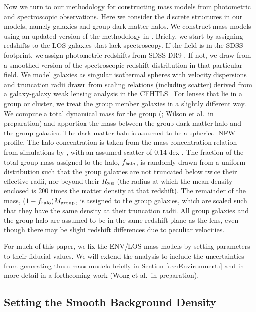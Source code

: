 \documentclass{emulateapj}
\begin{document}
Now we turn to our methodology for constructing mass models from photometric and spectroscopic observations. Here we consider the discrete structures in our models, namely galaxies and group dark matter halos. We construct mass models using an updated version of the methodology in \citet{Wong11}. Briefly, we start by assigning redshifts to the LOS galaxies that lack spectroscopy. If the field is in the SDSS footprint, we assign photometric redshifts from SDSS DR9 \citep{Ahn12, Csabai03}. If not, we draw from a smoothed version of the spectroscopic redshift distribution in that particular field. We model galaxies as singular isothermal spheres with velocity dispersions and truncation radii drawn from scaling relations (including scatter) derived from a galaxy-galaxy weak lensing analysis in the CFHTLS \citep{Brimioulle13}. For lenses that lie in a group or cluster, we treat the group member galaxies in a slightly different way. We compute a total dynamical mass for the group (\citealt{Girardi98,Momcheva06,Momcheva15}; Wilson et al.\ in preparation) and apportion the mass between the group dark matter halo and the group galaxies. The dark matter halo is assumed to be a spherical NFW profile. The halo concentration is taken from the mass-concentration relation from simulations by \citet{Zhao09}, with an assumed scatter of 0.14 dex \citep{Bullock01}. The fraction of the total group mass assigned to the halo, $f_{\rm{halo}}$, is randomly drawn from a uniform distribution such that the group galaxies are not truncated below twice their effective radii, nor beyond their $R_{200}$ (the radius at which the mean density enclosed is 200 times the matter density at that redshift). The remainder of the mass, $(1-f_{\rm{halo}})M_{\rm{group}}$, is assigned to the group galaxies, which are scaled such that they have the same density at their truncation radii. All group galaxies and the group halo are assumed to be in the same redshift plane as the lens, even though there may be slight redshift differences due to peculiar velocities. 

For much of this paper, we fix the ENV/LOS mass models by setting parameters to their fiducial values. We will extend the analysis to include the uncertainties from generating these mass models briefly in Section \ref{sec:Environments} and in more detail in a forthcoming work (Wong et al.\ in preparation). 

\subsection{Setting the Smooth Background Density}
\label{sec:voids}
\end{document}
